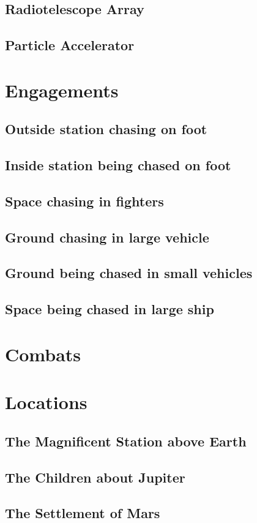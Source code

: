 \documentclass[a4paper]{article}
\begin{document}
\subsection{Radiotelescope Array}

\subsection{Particle Accelerator}


\section{Engagements}

\subsection{Outside station chasing on foot}

\subsection{Inside station being chased on foot}

\subsection{Space chasing in fighters}

\subsection{Ground chasing in large vehicle}

\subsection{Ground being chased in small vehicles}

\subsection{Space being chased in large ship}


\section{Combats}

\section{Locations}

\subsection{The Magnificent Station above Earth}

\subsection{The Children about Jupiter}

\subsection{The Settlement of Mars}
\end{document}
